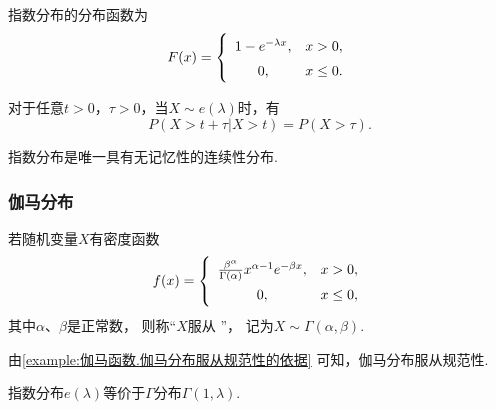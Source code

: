 \begin{theorem}
指数分布的分布函数为\begin{equation}
	F(x) = \left\{ \def\arraystretch{1.5}
	\begin{array}{cl}
		1 - e^{-\lambda x}, & x > 0, \\
		0, & x \leq 0. \\
	\end{array} \right.
\end{equation}
\end{theorem}

\begin{theorem}[指数分布的无记忆性]
对于任意\(t > 0\)，\(\tau > 0\)，当\(X \sim e(\lambda)\)时，有\[
	P(X > t + \tau \vert X > t) = P(X > \tau).
\]
\end{theorem}
\begin{remark}
指数分布是唯一具有无记忆性的连续性分布.
\end{remark}

\subsubsection{伽马分布}
\begin{definition}
若随机变量\(X\)有密度函数\begin{equation}\label{equation:连续型分布.伽马分布的密度函数}
	f(x) = \left\{ \def\arraystretch{1.5} \begin{array}{cl}
		\frac{\beta^\alpha}{\Gamma(\alpha)} x^{\alpha-1} e^{-\beta x},
			& x > 0, \\
		0, & x \leq 0, \\
	\end{array} \right.
\end{equation}
其中\(\alpha\)、\(\beta\)是正常数，
则称“\(X\)服从 ”，
记为\(X \sim \Gamma(\alpha,\beta)\).
\end{definition}

由\cref{example:伽马函数.伽马分布服从规范性的依据} 可知，伽马分布服从规范性.

指数分布\(e(\lambda)\)等价于\(\Gamma\)分布\(\Gamma(1,\lambda)\).

